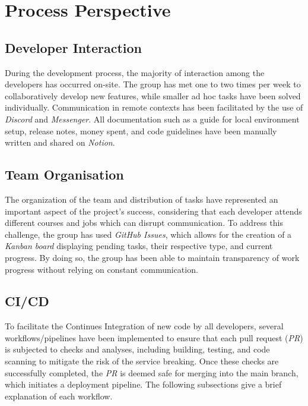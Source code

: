 \chapter{Process Perspective}

\section{Developer Interaction}

During the development process, the majority of interaction among the developers has occurred on-site. The group has met one to two times per week to collaboratively develop new features, while smaller ad hoc tasks have been solved individually. Communication in remote contexts has been facilitated by the use of \textit{Discord} and \textit{Messenger}. All documentation such as a guide for local environment setup, release notes, money spent, and code guidelines have been manually written and shared on \textit{Notion}.

\section{Team Organisation}

The organization of the team and distribution of tasks have represented an important aspect of the project's success, considering that each developer attends different courses and jobs which can disrupt communication. To address this challenge, the group has used \textit{GitHub Issues}, which allows for the creation of a \textit{Kanban board} displaying pending tasks, their respective type, and current progress. By doing so, the group has been able to maintain transparency of work progress without relying on constant communication.

\section{CI/CD}
\label{sec:ci-cd}

To facilitate the Continues Integration of new code by all developers, several workflows/pipelines have been implemented to ensure that each pull request (\textit{PR}) is subjected to checks and analyses, including building, testing, and code scanning to mitigate the risk of the service breaking. Once these checks are successfully completed, the \textit{PR} is deemed safe for merging into the main branch, which initiates a deployment pipeline. The following subsections give a brief explanation of each workflow. 

